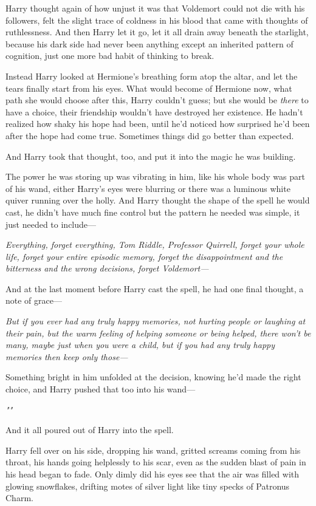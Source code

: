 Harry thought again of how unjust it was that Voldemort could not die with his
followers, felt the slight trace of coldness in his blood that came with
thoughts of ruthlessness. And then Harry let it go, let it all drain away
beneath the starlight, because his dark side had never been anything except an
inherited pattern of cognition, just one more bad habit of thinking to break.

Instead Harry looked at Hermione's breathing form atop the altar, and let the
tears finally start from his eyes. What would become of Hermione now, what path
she would choose after this, Harry couldn't guess; but she would be
\emph{there} to have a choice, their friendship wouldn't have destroyed her
existence. He hadn't realized how shaky his hope had been, until he'd noticed
how surprised he'd been after the hope had come true. Sometimes things did go
better than expected.

And Harry took that thought, too, and put it into the magic he was building.

The power he was storing up was vibrating in him, like his whole body was part
of his wand, either Harry's eyes were blurring or there was a luminous white
quiver running over the holly. And Harry thought the shape of the spell he
would cast, he didn't have much fine control but the pattern he needed was
simple, it just needed to include---

\emph{Everything, forget everything, Tom Riddle, Professor Quirrell, forget
your whole life, forget your entire episodic memory, forget the disappointment
and the bitterness and the wrong decisions, forget Voldemort---}

And at the last moment before Harry cast the spell, he had one final thought, a
note of grace---

\emph{But if you ever had any truly happy memories, not hurting people or
laughing at their pain, but the warm feeling of helping someone or being
helped, there won't be many, maybe just when you were a child, but if you had
any truly happy memories then keep only those---}

Something bright in him unfolded at the decision, knowing he'd made the right
choice, and Harry pushed that too into his wand---

\emph{"\textbf{}"}

And it all poured out of Harry into the spell.

Harry fell over on his side, dropping his wand, gritted screams coming from his
throat, his hands going helplessly to his scar, even as the sudden blast of
pain in his head began to fade. Only dimly did his eyes see that the air was
filled with glowing snowflakes, drifting motes of silver light like tiny specks
of Patronus Charm.

